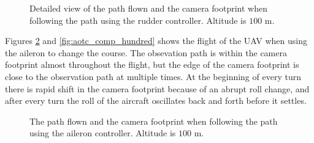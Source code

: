 \begin{figure}[]
    \centering
    \caption{Detailed view of the path flown and the camera footprint when following the path using the rudder controller. Altitude is $100$ m.}
	\label{fig:ratc_comp_hundred}
\end{figure}

Figures \ref{fig:aotc_path_hundred} and \ref{fig:aotc_comp_hundred} shows the flight of the UAV when using the aileron to change the course. The obsevation path is within the camera footprint almost throughout the flight, but the edge of the camera footprint is close to the observation path at multiple times. At the beginning of every turn there is rapid shift in the camera footprint because of an abrupt roll change, and after every turn the roll of the aircraft oscillates back and forth before it settles.

\begin{figure}[]
    \centering
    \caption{The path flown and the camera footprint when following the path using the aileron controller. Altitude is $100$ m.}
	\label{fig:aotc_path_hundred}
\end{figure}

